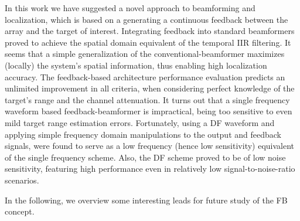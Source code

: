 In this work we have suggested a novel approach to beamforming and localization, which is based on a generating a continuous feedback between the array and the target of interest.
Integrating feedback into standard beamformers proved to achieve the spatial domain equivalent of the temporal IIR filtering.
It seems that a simple generalization of the conventional-beamformer maximizes (locally) the system's spatial information, thus enabling high localization accuracy.
The feedback-based architecture performance evaluation predicts an unlimited improvement in all criteria, when considering perfect knowledge of the target's range and the channel attenuation.
It turns out that a single frequency waveform based feedback-beamformer is impractical, being too sensitive to even mild target range estimation errors.
Fortunately, using a DF waveform and applying simple frequency domain manipulations to the output and feedback signals, were found to serve as a low frequency (hence low sensitivity) equivalent of the single frequency scheme.
Also, the DF scheme proved to be of low noise sensitivity, featuring high performance even in relatively low signal-to-noise-ratio scenarios.
\par In the following, we overview some interesting leads for future study of the FB concept.